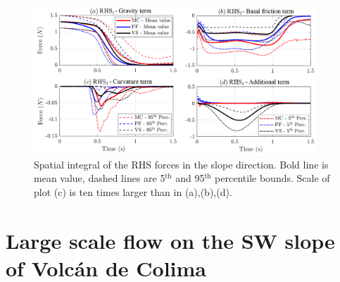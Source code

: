 \documentclass{article}
\begin{document}
\begin{figure}[H]
        \centering
        \includegraphics[width=0.95\textwidth]{ancFigs/incline/Forces_inc.png}
        \caption{Spatial integral of the RHS forces in the slope direction. Bold line is mean value, dashed lines are 5$^{\mathrm{th}}$ and 95$^{\mathrm{th}}$ percentile bounds. Scale of plot (c) is ten times larger than in (a),(b),(d).}
        \label{fig:Ramp-Fx-spatial}
\end{figure}
\newpage
\section{Large scale flow on the SW slope of Volc{\'a}n de Colima}
\end{document}
